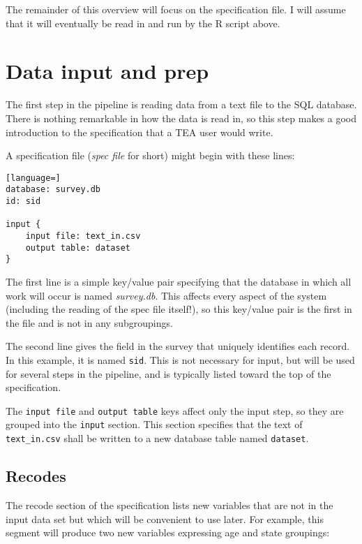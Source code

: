 \documentclass{article}
\begin{document}
The remainder of this overview will focus on the specification file.  I will assume that
it will eventually be read in and run by the R script above.

\section{Data input and prep}
The first step in the pipeline is reading data from a text file to the SQL database. 
There is nothing remarkable in how the data is read in, so this step makes a good 
introduction to the specification that a TEA user would write. 

A specification file ({\em spec file} for short) might begin with these lines:

\begin{lstlisting}[language=]
database: survey.db
id: sid

input { 
    input file: text_in.csv
    output table: dataset
}
\end{lstlisting}

The first line is a simple key/value pair specifying that the database in which all work
will occur is named {\em survey.db}. This affects every aspect of the system (including
the reading of the spec file itself!), so this key/value pair is the first in the file and
is not in any subgroupings.

The second line gives the field in the survey that uniquely identifies each record. In
this example, it is named {\tt sid}. This is not necessary for input, but will be used for
several steps in the pipeline, and is typically listed toward the top of the
specification.

The {\tt input file} and {\tt output table} keys affect only the input step, so they are
grouped into the {\tt input} section. This section specifies that the text of {\tt
text\_in.csv} shall be written to a new database table named {\tt dataset}.

\subsection{Recodes}  The recode section of the specification lists new variables that are
not in the input data set but which will be convenient to use later. For example, this
segment will produce two new variables expressing age and state groupings:
\end{document}
